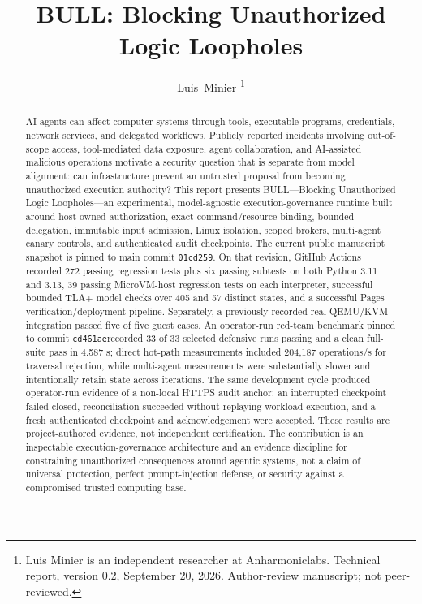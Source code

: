\documentclass[journal]{IEEEtran}
\newcommand{\bull}{\textsc{BULL}}
\newcommand{\mainshort}{\texttt{01cd259}}
\newcommand{\benchshort}{\texttt{cd461ae}}
\begin{document}
\title{BULL: Blocking Unauthorized Logic Loopholes}

\author{Luis~Minier%
\thanks{Luis Minier is an independent researcher at Anharmoniclabs. Technical report, version 0.2, September 20, 2026. Author-review manuscript; not peer-reviewed.}}

\maketitle

\begin{abstract}
AI agents can affect computer systems through tools, executable programs, credentials, network services, and delegated workflows. Publicly reported incidents involving out-of-scope access, tool-mediated data exposure, agent collaboration, and AI-assisted malicious operations motivate a security question that is separate from model alignment: can infrastructure prevent an untrusted proposal from becoming unauthorized execution authority? This report presents \bull---Blocking Unauthorized Logic Loopholes---an experimental, model-agnostic execution-governance runtime built around host-owned authorization, exact command/resource binding, bounded delegation, immutable input admission, Linux isolation, scoped brokers, multi-agent canary controls, and authenticated audit checkpoints. The current public manuscript snapshot is pinned to main commit \mainshort. On that revision, GitHub Actions recorded 272 passing regression tests plus six passing subtests on both Python 3.11 and 3.13, 39 passing MicroVM-host regression tests on each interpreter, successful bounded TLA+ model checks over 405 and 57 distinct states, and a successful Pages verification/deployment pipeline. Separately, a previously recorded real QEMU/KVM integration passed five of five guest cases. An operator-run red-team benchmark pinned to commit \benchshort recorded 33 of 33 selected defensive runs passing and a clean full-suite pass in 4.587 s; direct hot-path measurements included 204,187 operations/s for traversal rejection, while multi-agent measurements were substantially slower and intentionally retain state across iterations. The same development cycle produced operator-run evidence of a non-local HTTPS audit anchor: an interrupted checkpoint failed closed, reconciliation succeeded without replaying workload execution, and a fresh authenticated checkpoint and acknowledgement were accepted. These results are project-authored evidence, not independent certification. The contribution is an inspectable execution-governance architecture and an evidence discipline for constraining unauthorized consequences around agentic systems, not a claim of universal protection, perfect prompt-injection defense, or security against a compromised trusted computing base.
\end{abstract}
\end{document}

